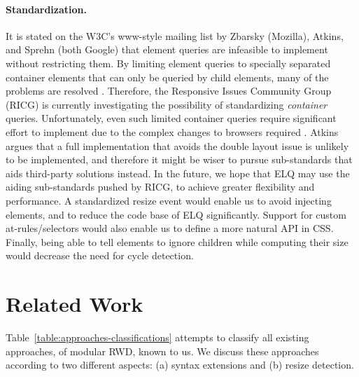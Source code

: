 \documentclass{llncs}
\newcommand{\elq}{ELQ}
\begin{document}
  \paragraph{Standardization.}
    It is stated on the W3C's www-style mailing list \cite{w3c_eq_mail} by Zbarsky (Mozilla), Atkins, and Sprehn (both Google) that element queries are infeasible to implement without restricting them.
    By limiting element queries to specially separated container elements that can only be queried by child elements, many of the problems are resolved \cite{ricg_irc_log,ricg_issue_viewport}.
    Therefore, the Responsive Issues Community Group (RICG) is currently investigating the possibility of standardizing \emph{container} queries.
    Unfortunately, even such limited container queries require significant effort to implement due to the complex changes to browsers required \cite{ricg_issue_viewport}.
    Atkins argues that a full implementation that avoids the double layout issue is unlikely to be implemented, and therefore it might be wiser to pursue sub-standards that aids third-party solutions instead.
    In the future, we hope that \elq{} may use the aiding sub-standards pushed by RICG, to achieve greater flexibility and performance.
    A standardized resize event would enable us to avoid injecting elements, and to reduce the code base of \elq{} significantly.
    Support for custom at-rules/selectors would also enable us to define a more natural API in CSS.
    Finally, being able to tell elements to ignore children while computing their size would decrease the need for cycle detection.

\section{Related Work}\label{sec:related}
  Table~\ref{table:approaches-classifications} attempts to classify all existing approaches, of modular RWD, known to us.
  We discuss these approaches according to two different aspects: (a) syntax extensions and (b) resize detection.
\end{document}
